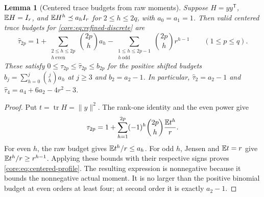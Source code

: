 \documentclass[11pt,a4paper]{article}
\newtheorem{lemma}[theorem]{Lemma}
\theoremstyle{definition}\newtheorem{definition}[theorem]{Definition}
\theoremstyle{remark}\newtheorem{remark}[theorem]{Remark}
\numberwithin{equation}{section}
\newcommand{\norm}[1]{\lVert#1\rVert}\newcommand{\ip}[2]{\langle#1,#2\rangle}
\DeclareMathOperator{\tr}{tr}\DeclareMathOperator{\rank}{rank}
\begin{document}
\begin{lemma}[Centered trace budgets from raw moments]
\label{core:lem:centered-profile}
Suppose $H=yy^{\mathsf T}$, $\mathbb E H=I_r$, and
$\mathbb E H^h\preceq a_hI_r$ for $2\le h\le2q$, with $a_0=a_1=1$.
Then valid centered trace budgets for
\eqref{core:eq:refined-discrete} are
\begin{equation}\label{core:eq:centered-profile}
 \widehat\tau_{2p}
 =1+\sum_{\substack{2\le h\le2p\\h\ \mathrm{even}}}
        \binom{2p}{h}a_h
   -\sum_{\substack{1\le h\le2p-1\\h\ \mathrm{odd}}}
        \binom{2p}{h}r^{h-1}\qquad(1\le p\le q).
\end{equation}
These satisfy $0\le\tau_{2p}\le\widehat\tau_{2p}\le b_{2p}$
for the positive shifted budgets
$b_j=\sum_{h=0}^j\binom jh a_h$ at $j\ge3$ and
$b_2=a_2-1$. In particular,
$\widehat\tau_2=a_2-1$ and
$\widehat\tau_4=a_4+6a_2-4r^2-3$.
\end{lemma}
\begin{proof}
Put $t=\tr H=\norm y^2$. The rank-one identity and the even power give
\[
 \tau_{2p}=1+\sum_{h=1}^{2p}(-1)^h\binom{2p}{h}\frac{\mathbb E t^h}{r}.
\]
For even $h$, the raw budget gives $\mathbb E t^h/r\le a_h$.
For odd $h$, Jensen and $\mathbb E t=r$ give
$\mathbb E t^h/r\ge r^{h-1}$. Applying these bounds with their respective
signs proves \eqref{core:eq:centered-profile}. The resulting expression
is nonnegative because it bounds the nonnegative actual moment.
It is no larger than the positive binomial budget at even orders
at least four; at second order it is exactly $a_2-1$.
\end{proof}
\end{document}
